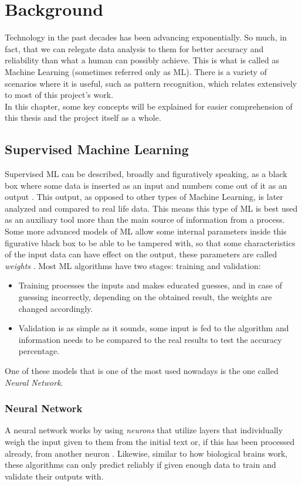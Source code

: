 \chapter{Background}
\label{ch2}
Technology in the past decades has been advancing exponentially. So much, in fact, that we can relegate data analysis to them for better accuracy and reliability than what a human can possibly achieve. This is what is called as Machine Learning (sometimes referred only as ML).
There is a variety of scenarios where it is useful, such as pattern recognition, which relates extensively to most of this project's work.\\
In this chapter, some key concepts will be explained for easier comprehension of this thesis and the project itself as a whole.

\section{Supervised Machine Learning}
Supervised ML can be described, broadly and figuratively speaking, as a black box where some data is inserted as an input and numbers come out of it as an output \citep{rf8}. This output, as opposed to other types of Machine Learning, is later analyzed and compared to real life data. This means this type of ML is best used as an auxiliary tool more than the main source of information from a process.
Some more advanced models of ML allow some internal parameters inside this figurative black box to be able to be tampered with, so that some characteristics of the input data can have effect on the output, these parameters are called \textit{weights} \citep{rf9}.
Most ML algorithms have two stages: training and validation:
\begin{itemize}
\item Training processes the inputs and makes educated guesses, and in case of guessing incorrectly, depending on the obtained result, the weights are changed accordingly.
\item Validation is as simple as it sounds, some input is fed to the algorithm and information needs to be compared to the real results to test the accuracy percentage.
\end{itemize}
One of these models that is one of the most used nowadays is the one called \textit{Neural Network}.

\subsection{Neural Network}
A neural network works by using \textit{neurons} that utilize layers that individually weigh the input given to them from the initial text or, if this has been processed already, from another neuron \citep{rf9}.
Likewise, similar to how biological brains work, these algorithms can only predict reliably if given enough data to train and validate their outputs with.

